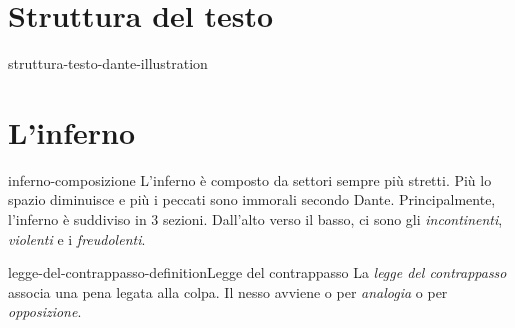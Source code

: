 \documentclass[preview]{standalone}
\begin{document}
\genpage

\section{Struttura del testo}

\begin{snippet}{struttura-testo-dante-illustration}
    \begin{center}
    \end{center}
    \phantom{}
\end{snippet}

\section{L'inferno}

\begin{snippet}{inferno-composizione}
    L'inferno è composto da settori sempre più stretti. Più lo spazio diminuisce e più i peccati sono immorali
    secondo Dante.
    Principalmente, l'inferno è suddiviso in 3 sezioni.
    Dall'alto verso il basso, ci sono gli \textit{incontinenti}, \textit{violenti} e
    i \textit{freudolenti}.
\end{snippet}

\begin{snippetdefinition}{legge-del-contrappasso-definition}{Legge del contrappasso}
    La \textit{legge del contrappasso} associa una pena
    legata alla colpa.
    Il nesso avviene o per \textit{analogia} o per \textit{opposizione}.
\end{snippetdefinition}
\end{document}
